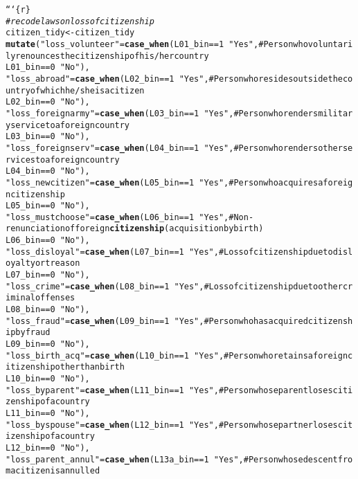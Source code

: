 \documentclass{article}\usepackage[]{graphicx}\usepackage[]{xcolor}
\makeatletter
\newcommand{\hlstr}[1]{\textcolor[rgb]{0.192,0.494,0.8}{#1}}%
\newcommand{\hlcom}[1]{\textcolor[rgb]{0.678,0.584,0.686}{\textit{#1}}}%
\newcommand{\hlkwd}[1]{\textcolor[rgb]{0.737,0.353,0.396}{\textbf{#1}}}%
\newenvironment{kframe}{%
 \def\at@end@of@kframe{}%
 \ifinner\ifhmode%
  \def\at@end@of@kframe{\end{minipage}}%
  \begin{minipage}{\columnwidth}%
 \fi\fi%
 \def\FrameCommand##1{\hskip\@totalleftmargin \hskip-\fboxsep
 \colorbox{shadecolor}{##1}\hskip-\fboxsep
     \hskip-\linewidth \hskip-\@totalleftmargin \hskip\columnwidth}%
 \MakeFramed {\advance\hsize-\width
   \@totalleftmargin\z@ \linewidth\hsize
   \@setminipage}}%
 {\par\unskip\endMakeFramed%
 \at@end@of@kframe}
\newenvironment{knitrout}{}{} %
\makeatother
\begin{document}
\begin{knitrout}
\begin{kframe}
\begin{alltt}
```\{r\}
\hlcom{# recode laws on loss of citizenship}
citizen_tidy <- citizen_tidy %>%
  \hlkwd{mutate}(\hlstr{"loss_volunteer"} = \hlkwd{case_when}(L01_bin == 1 ~ \hlstr{"Yes"}, # Person who voluntarily renounces the citizenship of his/her country
                                      L01_bin == 0 ~ \hlstr{"No"}),
         \hlstr{"loss_abroad"} = \hlkwd{case_when}(L02_bin == 1 ~ \hlstr{"Yes"}, # Person who resides outside the country of which he/she is a citizen
                                   L02_bin == 0 ~ \hlstr{"No"}),
         \hlstr{"loss_foreignarmy"} = \hlkwd{case_when}(L03_bin == 1 ~ \hlstr{"Yes"}, # Person who renders military service to a foreign country
                                        L03_bin == 0 ~ \hlstr{"No"}),
         \hlstr{"loss_foreignserv"}  = \hlkwd{case_when} (L04_bin == 1 ~ \hlstr{"Yes"}, # Person who renders other services to a foreign country
                                          L04_bin == 0 ~ \hlstr{"No"}),
         \hlstr{"loss_newcitizen"} = \hlkwd{case_when}(L05_bin == 1 ~ \hlstr{"Yes"}, # Person who acquires a foreign citizenship
                                       L05_bin == 0 ~ \hlstr{"No"}),
         \hlstr{"loss_mustchoose"} = \hlkwd{case_when}(L06_bin == 1 ~ \hlstr{"Yes"}, # Non-renunciation of foreign \hlkwd{citizenship} (acquisition by birth)
                                       L06_bin == 0 ~ \hlstr{"No"}),
         \hlstr{"loss_disloyal"} = \hlkwd{case_when}(L07_bin == 1 ~ \hlstr{"Yes"}, # Loss of citizenship due to disloyalty or treason
                                     L07_bin == 0 ~ \hlstr{"No"}),
         \hlstr{"loss_crime"} = \hlkwd{case_when}(L08_bin == 1 ~ \hlstr{"Yes"}, # Loss of citizenship due to other criminal offenses
                                  L08_bin == 0 ~ \hlstr{"No"}),
         \hlstr{"loss_fraud"} = \hlkwd{case_when}(L09_bin == 1 ~ \hlstr{"Yes"}, # Person who has acquired citizenship by fraud
                                  L09_bin == 0 ~ \hlstr{"No"}),
         \hlstr{"loss_birth_acq"} = \hlkwd{case_when}(L10_bin == 1 ~ \hlstr{"Yes"}, # Person who retains a foreign citizenship other than birth
                                      L10_bin == 0 ~ \hlstr{"No"}),
         \hlstr{"loss_byparent"} = \hlkwd{case_when}(L11_bin == 1 ~ \hlstr{"Yes"}, # Person whose parent loses citizenship of a country
                                     L11_bin == 0 ~ \hlstr{"No"}),
         \hlstr{"loss_byspouse"} = \hlkwd{case_when}(L12_bin == 1 ~ \hlstr{"Yes"}, # Person whose partner loses citizenship of a country
                                     L12_bin == 0 ~ \hlstr{"No"}),
         \hlstr{"loss_parent_annul"} = \hlkwd{case_when}(L13a_bin == 1 ~ \hlstr{"Yes"}, # Person whose descent from a citizen is annulled

\end{alltt}
\end{kframe}
\end{knitrout}
\end{document}
